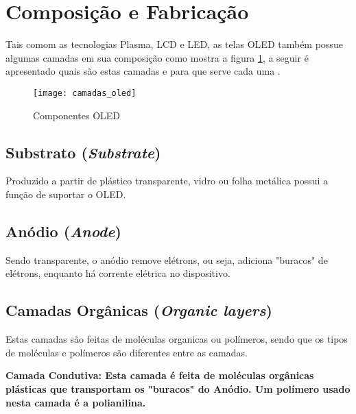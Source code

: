 \section{Composição e Fabricação}
\label{sec:camadas}

Tais comom as tecnologias Plasma, LCD e LED, as telas OLED também possue algumas camadas em sua composição como mostra a figura \ref{fig:camadas_oled}, a seguir é apresentado quais são estas camadas e para que serve cada uma \cite{HSWOLED}. 

\begin{figure}[!h]
  \centering
  \texttt{[image: camadas\_oled]} 
  \caption{Componentes OLED}
  \label{fig:camadas_oled} 
\end{figure}


\subsection{Substrato (\textit{Substrate})}
\label{sec:substrato}

Produzido a partir de plástico transparente, vidro ou folha metálica possui a função de suportar o OLED.


\subsection{Anódio (\textit{Anode})}
\label{sec:substrato}

Sendo transparente, o anódio remove elétrons, ou seja, adiciona "buracos" de elétrons, enquanto há corrente elétrica no dispositivo.


\subsection{Camadas Orgânicas (\textit{Organic layers})}
\label{sec:substrato}

Estas camadas são feitas de moléculas organicas ou polímeros, sendo que os tipos de moléculas e polímeros são diferentes entre as camadas.

\bf{Camada Condutiva:} Esta camada é feita de moléculas orgânicas plásticas que transportam os "buracos" do Anódio. Um polímero usado nesta camada é a polianilina.


